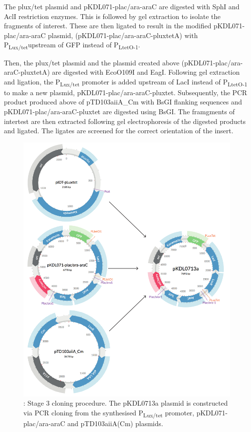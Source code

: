  The plux/tet plasmid and pKDL071-plac/ara-araC are digested with SphI and AclI restriction enzymes. This is followed by gel extraction to isolate the fragments of interest. These are then ligated to result in the modified pKDL071-plac/ara-araC plasmid, (pKDL071-plac/ara-araC-pluxtetA) with P\textsubscript{Lux/tet}upstream of GFP instead of P\textsubscript{LtetO-1}.
 
Then, the plux/tet plasmid and the plasmid created above (pKDL071-plac/ara-araC-pluxtetA) are digested with EcoO109I and EagI. Following gel extraction and ligation, the P\textsubscript{Lux/tet} promoter is added upstream of LacI instead of P\textsubscript{LtetO-1} to make a new plasmid, pKDL071-plac/ara-araC-pluxtet. Subsequently, the PCR product produced above of pTD103aiiA\_Cm with BsGI flanking sequences and pKDL071-plac/ara-araC-pluxtet are digested using BsGI. The framgments of intertest are then extracted following gel electrophoresis of the digested products and ligated. The ligates are screened for the correct orientation of the insert. 


\begin{figure}[htbp]
	\begin{center}
		\includegraphics[scale=0.7]{../../chapters/chapterDesignSwitches/images/stage3_cloning.pdf}
		\caption[LoF caption]{\label{fig:stage3}: Stage 3 cloning procedure. The pKDL0713a plasmid is constructed via PCR cloning from the synthesised P\textsubscript{Lux/tet} promoter, pKDL071-plac/ara-araC and pTD103aiiA(Cm) plasmids.}
	\end{center}
\end{figure}
\clearpage

